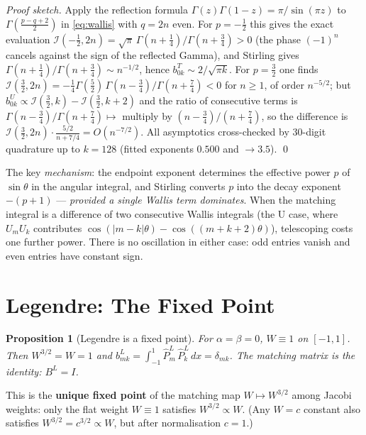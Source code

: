 \documentclass[11pt,a4paper]{article}
\newtheorem{proposition}[theorem]{Proposition}
\newcommand{\G}{\Gamma}
\begin{document}
\begin{proof}[Proof sketch]
  Apply the reflection formula $\G(z)\G(1-z)=\pi/\sin(\pi z)$ to
  $\G(\tfrac{p-q+2}{2})$ in \eqref{eq:wallis} with $q=2n$ even.
  For $p=-\tfrac12$ this gives the exact evaluation
  $\mathcal{I}(-\tfrac12,2n)=\sqrt\pi\,\G(n+\tfrac14)/\G(n+\tfrac34)>0$
  (the phase $(-1)^n$ cancels against the sign of the reflected Gamma), and
  Stirling gives $\G(n+\tfrac14)/\G(n+\tfrac34)\sim n^{-1/2}$, hence
  $b_{0k}^T\sim 2/\sqrt{\pi k}$.
  For $p=\tfrac32$ one finds
  $\mathcal{I}(\tfrac32,2n)=-\tfrac14\G(\tfrac52)\,\G(n-\tfrac34)/\G(n+\tfrac74)<0$
  for $n\ge1$, of order $n^{-5/2}$; but
  $b_{0k}^U\propto\mathcal{I}(\tfrac32,k)-\mathcal{I}(\tfrac32,k{+}2)$ and the
  ratio of consecutive terms is $\G(n-\tfrac34)/\G(n+\tfrac74)\mapsto$
  multiply by $(n-\tfrac34)/(n+\tfrac74)$, so the difference is
  $\mathcal{I}(\tfrac32,2n)\cdot\tfrac{5/2}{n+7/4}=O(n^{-7/2})$.
  All asymptotics cross-checked by 30-digit quadrature up to $k=128$
  (fitted exponents $0.500$ and $\to3.5$). \qed
\end{proof}

\noindent The key \emph{mechanism}: the endpoint exponent determines the effective
power $p$ of $\sin\theta$ in the angular integral, and Stirling converts $p$ into
the decay exponent $-(p+1)$ --- \emph{provided a single Wallis term dominates}.
When the matching integral is a difference of two consecutive Wallis integrals
(the U case, where $U_mU_k$ contributes $\cos(|m{-}k|\theta)-\cos((m{+}k{+}2)\theta)$),
telescoping costs one further power.  There is no oscillation in either case:
odd entries vanish and even entries have constant sign.

\section{Legendre: The Fixed Point}

\begin{proposition}[Legendre is a fixed point]
  For $\alpha=\beta=0$, $W\equiv 1$ on $[-1,1]$.  Then $W^{3/2}=W=1$ and
  $b_{mk}^L = \int_{-1}^1 \widehat P_m^L\,\widehat P_k^L\,dx = \delta_{mk}$.
  The matching matrix is the identity: $B^L=I$.
\end{proposition}

This is the \textbf{unique fixed point} of the matching map $W\mapsto W^{3/2}$
among Jacobi weights: only the flat weight $W\equiv1$ satisfies $W^{3/2}\propto W$.
(Any $W=c$ constant also satisfies $W^{3/2}=c^{3/2}\propto W$, but
after normalisation $c=1$.)
\end{document}
